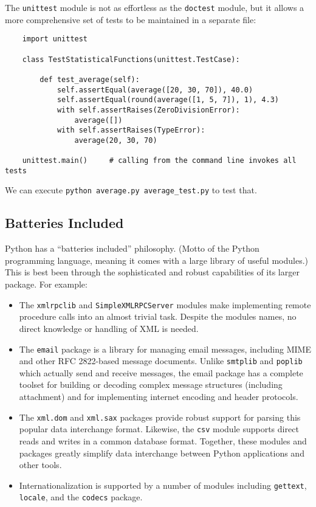 \documentclass[UTF8]{article}
\begin{document}
The \texttt{unittest} module is not as effortless as the \texttt{doctest} module, but it allows a
more comprehensive set of tests to be maintained in a separate file:
\begin{verbatim}
    import unittest

    class TestStatisticalFunctions(unittest.TestCase):

        def test_average(self):
            self.assertEqual(average([20, 30, 70]), 40.0)
            self.assertEqual(round(average([1, 5, 7]), 1), 4.3)
            with self.assertRaises(ZeroDivisionError):
                average([])
            with self.assertRaises(TypeError):
                average(20, 30, 70)

    unittest.main()     # calling from the command line invokes all tests
\end{verbatim}

We can execute \texttt{python average.py average_test.py} to test that.

\subsection{Batteries Included}
Python has a ``batteries included'' philosophy. (Motto of the Python programming language, meaning
it comes with a large library of useful modules.) This is best been through the sophisticated and
robust capabilities of its larger package. For example:
\begin{itemize}
    \item The \texttt{xmlrpclib} and \texttt{SimpleXMLRPCServer} modules make implementing remote
    procedure calls into an almost trivial task. Despite the modules names, no direct knowledge or
    handling of XML is needed.
    \item The \texttt{email} package is a library for managing email messages, including MIME and
    other RFC 2822-based message documents. Unlike \texttt{smtplib} and \texttt{poplib} which
    actually send and receive messages, the email package has a complete toolset for building or
    decoding complex message structures (including attachment) and for implementing internet
    encoding and header protocols.
    \item The \texttt{xml.dom} and \texttt{xml.sax} packages provide robust support for parsing
    this popular data interchange format. Likewise, the \texttt{csv} module supports direct reads
    and writes in a common database format. Together, these modules and packages greatly simplify
    data interchange between Python applications and other tools.
    \item Internationalization is supported by a number of modules including \texttt{gettext},
    \texttt{locale}, and the \texttt{codecs} package.
\end{itemize}
\end{document}
